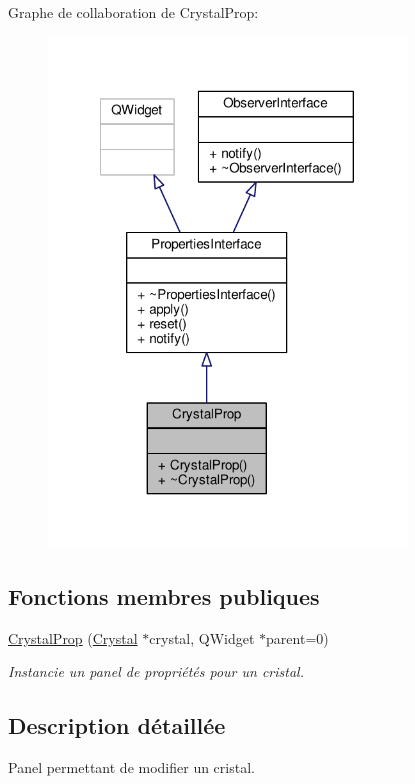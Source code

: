 Graphe de collaboration de Crystal\+Prop\+:\nopagebreak
\begin{figure}[H]
\begin{center}
\leavevmode
\includegraphics[width=269pt]{d0/d15/classCrystalProp__coll__graph}
\end{center}
\end{figure}
\subsection*{Fonctions membres publiques}
\begin{DoxyCompactItemize}
\item 
\hyperlink{classCrystalProp_a47068eadccacdada66efdec58235ce94}{Crystal\+Prop} (\hyperlink{classCrystal}{Crystal} $\ast$crystal, Q\+Widget $\ast$parent=0)
\begin{DoxyCompactList}\small\item\em Instancie un panel de propriétés pour un cristal. \end{DoxyCompactList}\end{DoxyCompactItemize}


\subsection{Description détaillée}
Panel permettant de modifier un cristal. 

